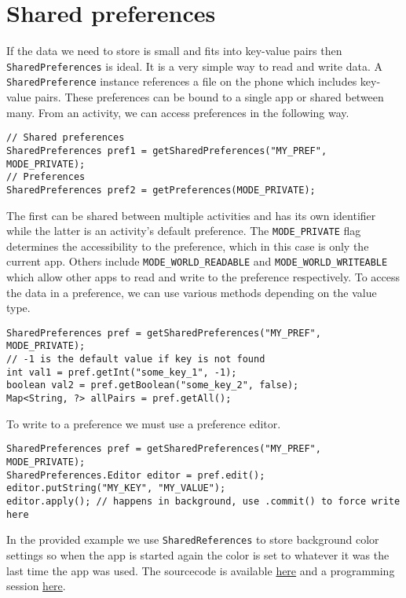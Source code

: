 \graphicspath{{./lab05/Images/}}


\maketocpage

\section{Shared preferences}
If the data we need to store is small and fits into key-value pairs then \texttt{SharedPreferences} is ideal. It is a very simple way to read and write data. A \texttt{SharedPreference} instance references a file on the phone which includes key-value pairs. These preferences can be bound to a single app or shared between many. From an activity, we can access preferences in the following way.
\begin{lstlisting}[style=A_Java]
// Shared preferences
SharedPreferences pref1 = getSharedPreferences("MY_PREF", MODE_PRIVATE);
// Preferences
SharedPreferences pref2 = getPreferences(MODE_PRIVATE);
\end{lstlisting}
The first can be shared between multiple activities and has its own identifier while the latter is an activity's default preference. The \texttt{MODE\_PRIVATE} flag determines the accessibility to the preference, which in this case is only the current app. Others include \texttt{MODE\_WORLD\_READABLE} and \texttt{MODE\_WORLD\_WRITEABLE} which allow other apps to read and write to the preference respectively. To access the data in a preference, we can use various methods depending on the value type.
\begin{lstlisting}[style=A_Java]
SharedPreferences pref = getSharedPreferences("MY_PREF", MODE_PRIVATE);
// -1 is the default value if key is not found
int val1 = pref.getInt("some_key_1", -1);
boolean val2 = pref.getBoolean("some_key_2", false);
Map<String, ?> allPairs = pref.getAll();
\end{lstlisting}
To write to a preference we must use a preference editor.
\begin{lstlisting}[style=A_Java]
SharedPreferences pref = getSharedPreferences("MY_PREF", MODE_PRIVATE);
SharedPreferences.Editor editor = pref.edit();
editor.putString("MY_KEY", "MY_VALUE");
editor.apply(); // happens in background, use .commit() to force write here
\end{lstlisting}
In the provided example we use \texttt{SharedReferences} to store background color settings so when the app is started again the color is set to whatever it was the last time the app was used. The sourcecode is available \href{https://github.com/JonSteinn/AndroidDevelopment/tree/master/examples/lab5/colorpref}{here} and a programming session \href{https://www.youtube.com/watch?v=LbOh8KTwhVo}{here}.

